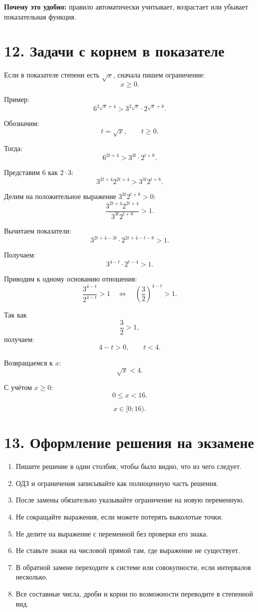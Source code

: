 \documentclass[a4paper,12pt]{article}
\newcommand{\sectionline}{\vspace{2mm}{\color{linegray}\hrule height 0.5pt}\vspace{2mm}}
\newcommand{\important}[1]{\textcolor{darkaccent}{\textbf{#1}}}
\begin{document}
\important{Почему это удобно:} правило автоматически учитывает, возрастает или убывает показательная функция.

\sectionline

\section*{\textcolor{darkaccent}{12. Задачи с корнем в показателе}}

Если в показателе степени есть $\sqrt{x}$, сначала пишем ограничение:
\[
x\ge0.
\]

Пример:
\[
6^{2\sqrt{x}+4}>3^{3\sqrt{x}}\cdot2^{\sqrt{x}+8}.
\]

Обозначим:
\[
t=\sqrt{x},\qquad t\ge0.
\]

Тогда:
\[
6^{2t+4}>3^{3t}\cdot2^{t+8}.
\]

Представим $6$ как $2\cdot3$:
\[
3^{2t+4}2^{2t+4}>3^{3t}2^{t+8}.
\]

Делим на положительное выражение $3^{3t}2^{t+8}>0$:
\[
\frac{3^{2t+4}2^{2t+4}}{3^{3t}2^{t+8}}>1.
\]

Вычитаем показатели:
\[
3^{2t+4-3t}\cdot2^{2t+4-t-8}>1.
\]

Получаем:
\[
3^{4-t}\cdot2^{t-4}>1.
\]

Приводим к одному основанию отношения:
\[
\frac{3^{4-t}}{2^{4-t}}>1
\quad\Longleftrightarrow\quad
\left(\frac32\right)^{4-t}>1.
\]

Так как
\[
\frac32>1,
\]
получаем:
\[
4-t>0,
\qquad t<4.
\]

Возвращаемся к $x$:
\[
\sqrt{x}<4.
\]

С учётом $x\ge0$:
\[
0\le x<16.
\]

\[
\boxed{x\in[0;16)}.
\]

\sectionline

\section*{\textcolor{darkaccent}{13. Оформление решения на экзамене}}

\begin{enumerate}
\item Пишите решение в один столбик, чтобы было видно, что из чего следует.
\item ОДЗ и ограничения записывайте как полноценную часть решения.
\item После замены обязательно указывайте ограничение на новую переменную.
\item Не сокращайте выражения, если можете потерять выколотые точки.
\item Не делите на выражение с переменной без проверки его знака.
\item Не ставьте знаки на числовой прямой там, где выражение не существует.
\item В обратной замене переходите к системе или совокупности, если интервалов несколько.
\item Все составные числа, дроби и корни по возможности переводите в степенной вид.
\end{enumerate}
\end{document}

